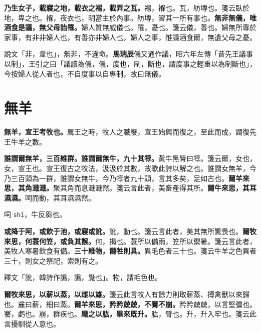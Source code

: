\textbf{乃生女子，載寢之地，載衣之裼，載弄之瓦。}{\footnotesize 裼，褓也。瓦，紡塼也。箋云臥於地，卑之也。褓，夜衣也，明當主於內事。紡塼，習其一所有事也。}\textbf{無非無儀，唯酒食是議，無父母詒罹。}{\footnotesize 婦人質無威儀也。罹，憂也。箋云儀，善也。婦無所專於家事，有非非婦人也，有善亦非婦人也，婦人之事，惟議酒食爾，無遺父母之憂。}

\begin{quoting}說文「非，韋也」，無非，不違命。\textbf{馬瑞辰}儀又通作議，昭六年左傳「昔先王議事以制」，王引之曰「議讀為儀，儀，度也，制，斷也，謂度事之輕重以為制斷也」，今按婦人從人者也，不自度事以自專制，故曰無儀。\end{quoting}

\section{無羊}


\textbf{無羊，宣王考牧也。}{\footnotesize 厲王之時，牧人之職廢，宣王始興而復之，至此而成，謂復先王牛羊之數。}

\textbf{誰謂爾無羊，三百維群。誰謂爾無牛，九十其犉。}{\footnotesize 黃牛黑脣曰犉。箋云爾，女也，女，宣王也。宣王復古之牧法，汲汲於其數，故歌此詩以解之也。誰謂女無羊，今乃三百頭為一群，誰謂女無牛，今乃犉者九十頭，言其多矣，足如古也。}\textbf{爾羊來思，其角濈濈。}{\footnotesize 聚其角而息濈濈然。箋云言此者，美畜產得其所。}\textbf{爾牛來思，其耳濕濕。}{\footnotesize 呞而動，其耳濕濕然。}

\begin{quoting}呞 \texttt{shī}，牛反芻也。\end{quoting}

\textbf{或降于阿，或飲于池，或寢或訛。}{\footnotesize 訛，動也。箋云言此者，美其無所驚畏也。}\textbf{爾牧來思，何蓑何笠，或負其餱。}{\footnotesize 何，揭也。蓑所以備雨，笠所以禦暑。箋云言此者，美牧人寒暑飲食有備。}\textbf{三十維物，爾牲則具。}{\footnotesize 異毛色者三十也。箋云牛羊之色異者三十，則女之祭祀，索則有之。}

\begin{quoting}釋文「訛，韓詩作譌，譌，覺也」。物，謂毛色也。\end{quoting}

\textbf{爾牧來思，以薪以蒸，以雌以雄。}{\footnotesize 箋云此言牧人有餘力則取薪蒸、搏禽獸以來歸也。麄曰薪，細曰蒸。}\textbf{爾羊來思，矜矜兢兢，不騫不崩。}{\footnotesize 矜矜兢兢，以言堅彊也。騫，虧也。崩，群疾也。}\textbf{麾之以肱，畢來既升。}{\footnotesize 肱，臂也。升，升入牢也。箋云此言擾馴從人意也。}

